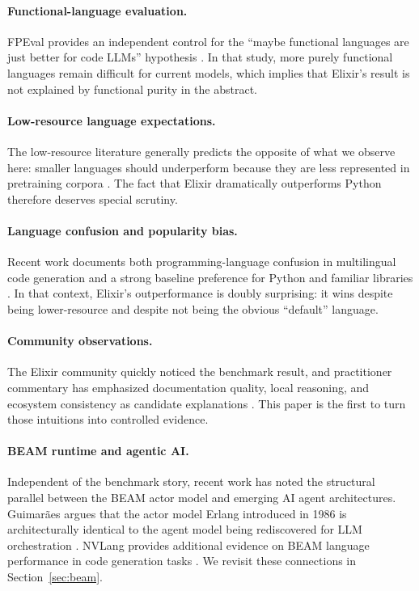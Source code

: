\documentclass[11pt]{article}
\newcommand{\elixir}{Elixir}
\newcommand{\pythonlang}{Python}
\begin{document}
\paragraph{Functional-language evaluation.}
FPEval provides an independent control for the ``maybe functional languages are just better for code LLMs'' hypothesis \cite{fpeval}. In that study, more purely functional languages remain difficult for current models, which implies that \elixir{}'s result is not explained by functional purity in the abstract.

\paragraph{Low-resource language expectations.}
The low-resource literature generally predicts the opposite of what we observe here: smaller languages should underperform because they are less represented in pretraining corpora \cite{lowresource}. The fact that \elixir{} dramatically outperforms \pythonlang{} therefore deserves special scrutiny.

\paragraph{Language confusion and popularity bias.}
Recent work documents both programming-language confusion in multilingual code generation \cite{plconfusion} and a strong baseline preference for Python and familiar libraries \cite{llmpreferences}. In that context, \elixir{}'s outperformance is doubly surprising: it wins despite being lower-resource and despite not being the obvious ``default'' language.

\paragraph{Community observations.}
The \elixir{} community quickly noticed the benchmark result, and practitioner commentary has emphasized documentation quality, local reasoning, and ecosystem consistency as candidate explanations \cite{dashbit,ronacher}. This paper is the first to turn those intuitions into controlled evidence.

\paragraph{BEAM runtime and agentic AI.}
Independent of the benchmark story, recent work has noted the structural parallel between the BEAM actor model and emerging AI agent architectures. Guimar\~{a}es argues that the actor model Erlang introduced in 1986 is architecturally identical to the agent model being rediscovered for LLM orchestration \cite{guimaraes}. NVLang provides additional evidence on BEAM language performance in code generation tasks \cite{nvlang}. We revisit these connections in Section~\ref{sec:beam}.
\end{document}
